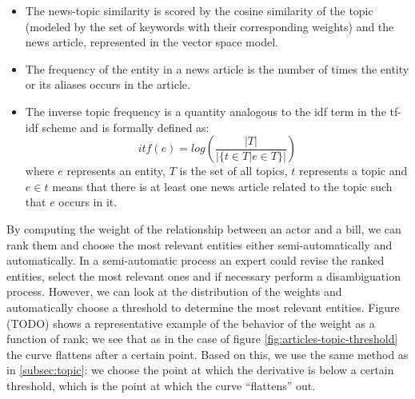 \begin{itemize}
\item The news-topic similarity is scored by the cosine similarity of the topic (modeled by the set of keywords with their corresponding weights) and the news article, represented in the vector space model.
\item The frequency of the entity in a news article is the number of times the entity or its aliases occurs in the article.
\item The inverse topic frequency is a quantity analogous to the idf term in the tf-idf scheme and is formally defined as: $$itf(e) = log(\frac{\left\vert{T}\right\vert}{\vert \{t \in T \vert e  \in T\} \vert })$$ where $e$ represents an entity, $T$ is the set of all topics, $t$ represents a topic and $e \in t$ means that there is at least one news article related to the topic such that $e$ occurs in it.
\end{itemize}

By computing the weight of the relationship between an actor and a bill, we can rank them and choose the most relevant entities either semi-automatically and automatically. In a semi-automatic process an expert could revise the ranked entities, select the most relevant ones and if necessary perform a disambiguation process. However, we can look at the distribution of the weights and automatically choose a threshold to determine the most relevant entities. Figure (TODO) shows a representative example of the behavior of the weight as a function of rank; we see that as in the case of figure \ref{fig:articles-topic-threshold} the curve flattens after a certain point. Based on this, we use the same method as in \ref{subsec:topic}:  we choose the point at which the derivative is below a certain threshold, which is the point at which the curve ``flattens'' out. 

